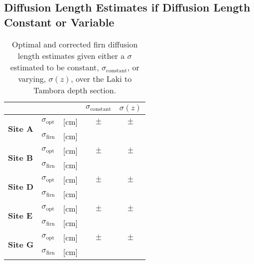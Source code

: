 \documentclass[../../CompleteThesis2/Complete_2ndDraft]{subfiles}
\begin{document}
\subsection[$\sigma$ Constant or Variable]{Diffusion Length Estimates if Diffusion Length Constant or Variable}
\label{Subsec:Results_DiffLenEst_AlphabetCores_SigConstVar}

\begin{table}[ht]
	\centering
	\begin{tabular}{l l l | c | c}
		& & & $\sigma_{\text{constant}}$ & $\sigma(z)$\\[0.15cm]
		\hline
		\hline 
		\multirow{2}{*}{\textbf{Site A}} & $\sigma_{\text{opt}}$ & [cm] & $ \pm$ & $ \pm $\\[0.1cm]
		& $\sigma_{\text{firn}}$ & [cm] & & \\[0.1cm]
		\hline
		
		\multirow{2}{*}{\textbf{Site B}} & $\sigma_{\text{opt}}$ & [cm] & $ \pm $ & $ \pm $ \\[0.1cm]
		& $\sigma_{\text{firn}}$ & [cm] & & \\[0.1cm]
		\hline
		
		\multirow{2}{*}{\textbf{Site D}} & $\sigma_{\text{opt}}$ & [cm] & $ \pm $ & $ \pm $ \\[0.1cm]
		& $\sigma_{\text{firn}}$ & [cm] & & \\[0.1cm]
		\hline
		
		\multirow{2}{*}{\textbf{Site E}} & $\sigma_{\text{opt}}$ & [cm] & $ \pm $ & $ \pm $ \\[0.1cm]
		& $\sigma_{\text{firn}}$ & [cm] & & \\[0.1cm]
		\hline
		
		\multirow{2}{*}{\textbf{Site G}} & $\sigma_{\text{opt}}$ & [cm] & $ \pm $ & $ \pm $ \\[0.1cm]
		& $\sigma_{\text{firn}}$ & [cm] & & \\[0.1cm]
		
		\hline
	\end{tabular}
	\caption[$\sigma$ Given Constant or Varying]{\small Optimal and corrected firn diffusion length estimates given either a $\sigma$ estimated to be constant, $\sigma_{\text{constant}}$, or varying, $\sigma(z)$, over the Laki to Tambora depth section. }
\end{table}
\end{document}
